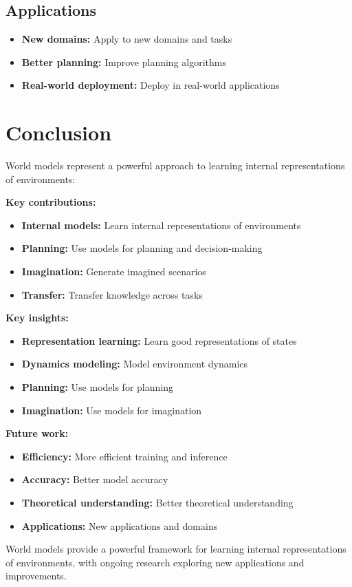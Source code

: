 \subsection{Applications}

\begin{itemize}
    \item \textbf{New domains:} Apply to new domains and tasks
    \item \textbf{Better planning:} Improve planning algorithms
    \item \textbf{Real-world deployment:} Deploy in real-world applications
\end{itemize}

\section{Conclusion}

World models represent a powerful approach to learning internal representations of environments:

\textbf{Key contributions:}
\begin{itemize}
    \item \textbf{Internal models:} Learn internal representations of environments
    \item \textbf{Planning:} Use models for planning and decision-making
    \item \textbf{Imagination:} Generate imagined scenarios
    \item \textbf{Transfer:} Transfer knowledge across tasks
\end{itemize}

\textbf{Key insights:}
\begin{itemize}
    \item \textbf{Representation learning:} Learn good representations of states
    \item \textbf{Dynamics modeling:} Model environment dynamics
    \item \textbf{Planning:} Use models for planning
    \item \textbf{Imagination:} Use models for imagination
\end{itemize}

\textbf{Future work:}
\begin{itemize}
    \item \textbf{Efficiency:} More efficient training and inference
    \item \textbf{Accuracy:} Better model accuracy
    \item \textbf{Theoretical understanding:} Better theoretical understanding
    \item \textbf{Applications:} New applications and domains
\end{itemize}

World models provide a powerful framework for learning internal representations of environments, with ongoing research exploring new applications and improvements.
